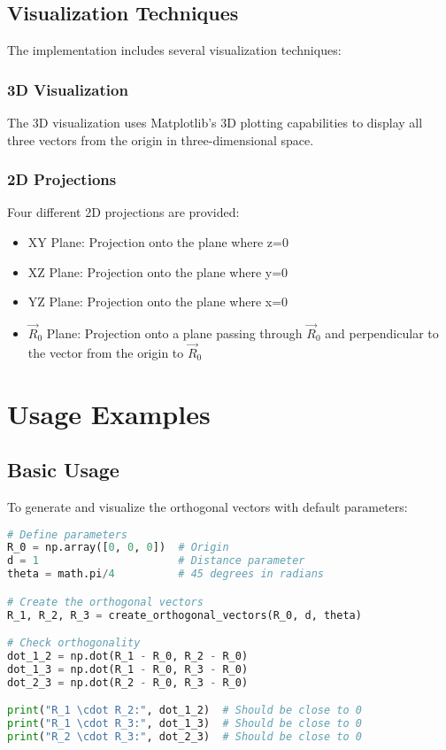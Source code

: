 \documentclass{article}
\begin{document}
\subsection{Visualization Techniques}
The implementation includes several visualization techniques:

\subsubsection{3D Visualization}
The 3D visualization uses Matplotlib's 3D plotting capabilities to display all three vectors from the origin in three-dimensional space.

\subsubsection{2D Projections}
Four different 2D projections are provided:
\begin{itemize}
    \item XY Plane: Projection onto the plane where z=0
    \item XZ Plane: Projection onto the plane where y=0
    \item YZ Plane: Projection onto the plane where x=0
    \item $\vec{R}_0$ Plane: Projection onto a plane passing through $\vec{R}_0$ and perpendicular to the vector from the origin to $\vec{R}_0$
\end{itemize}

\section{Usage Examples}

\subsection{Basic Usage}
To generate and visualize the orthogonal vectors with default parameters:

\begin{lstlisting}[language=Python, caption=Basic Usage Example]
# Define parameters
R_0 = np.array([0, 0, 0])  # Origin
d = 1                      # Distance parameter
theta = math.pi/4          # 45 degrees in radians

# Create the orthogonal vectors
R_1, R_2, R_3 = create_orthogonal_vectors(R_0, d, theta)

# Check orthogonality
dot_1_2 = np.dot(R_1 - R_0, R_2 - R_0)
dot_1_3 = np.dot(R_1 - R_0, R_3 - R_0)
dot_2_3 = np.dot(R_2 - R_0, R_3 - R_0)

print("R_1 \cdot R_2:", dot_1_2)  # Should be close to 0
print("R_1 \cdot R_3:", dot_1_3)  # Should be close to 0
print("R_2 \cdot R_3:", dot_2_3)  # Should be close to 0
\end{lstlisting}
\end{document}
